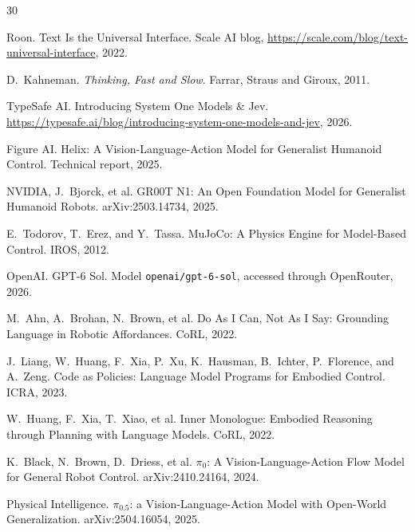 \documentclass[11pt]{article}
\begin{document}

\begin{thebibliography}{30}

Roon.
\newblock Text Is the Universal Interface.
\newblock Scale AI blog, \url{https://scale.com/blog/text-universal-interface}, 2022.

D.\ Kahneman.
\newblock \emph{Thinking, Fast and Slow}.
\newblock Farrar, Straus and Giroux, 2011.

TypeSafe AI.
\newblock Introducing System One Models \& Jev.
\newblock \url{https://typesafe.ai/blog/introducing-system-one-models-and-jev}, 2026.

Figure AI.
\newblock Helix: A Vision-Language-Action Model for Generalist Humanoid Control.
\newblock Technical report, 2025.

NVIDIA, J.\ Bjorck, et al.
\newblock GR00T N1: An Open Foundation Model for Generalist Humanoid Robots.
\newblock arXiv:2503.14734, 2025.

E.\ Todorov, T.\ Erez, and Y.\ Tassa.
\newblock MuJoCo: A Physics Engine for Model-Based Control.
\newblock IROS, 2012.

OpenAI.
\newblock GPT-6 Sol.
\newblock Model \texttt{openai/gpt-6-sol}, accessed through OpenRouter, 2026.

M.\ Ahn, A.\ Brohan, N.\ Brown, et al.
\newblock Do As I Can, Not As I Say: Grounding Language in Robotic Affordances.
\newblock CoRL, 2022.

J.\ Liang, W.\ Huang, F.\ Xia, P.\ Xu, K.\ Hausman, B.\ Ichter, P.\ Florence, and A.\ Zeng.
\newblock Code as Policies: Language Model Programs for Embodied Control.
\newblock ICRA, 2023.

W.\ Huang, F.\ Xia, T.\ Xiao, et al.
\newblock Inner Monologue: Embodied Reasoning through Planning with Language Models.
\newblock CoRL, 2022.

K.\ Black, N.\ Brown, D.\ Driess, et al.
\newblock $\pi_0$: A Vision-Language-Action Flow Model for General Robot Control.
\newblock arXiv:2410.24164, 2024.

Physical Intelligence.
\newblock $\pi_{0.5}$: a Vision-Language-Action Model with Open-World Generalization.
\newblock arXiv:2504.16054, 2025.


\end{thebibliography}
\end{document}

